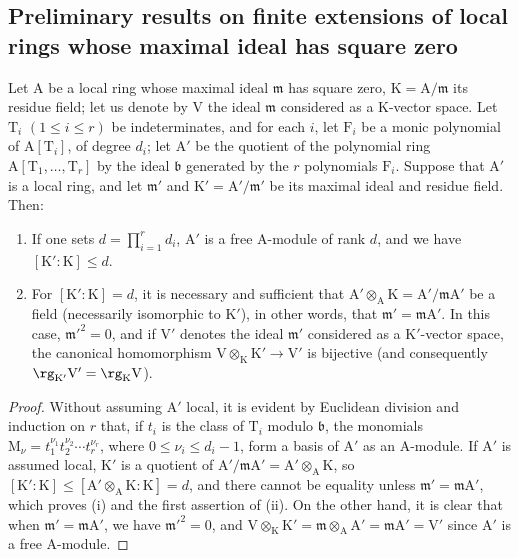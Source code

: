 \subsection{Preliminary results on finite extensions of local rings whose maximal ideal has square zero}
\label{subsection:0.22.4}
\label{0.22.4}

\begin{proposition}[22.4.1]
\label{0.22.4.1}
Let $\mathrm{A}$ be a local ring whose maximal ideal $\mathfrak{m}$ has square zero, $\mathrm{K}=\mathrm{A}/\mathfrak{m}$ its residue field; let us denote by $\mathrm{V}$ the ideal $\mathfrak{m}$ considered as a $\mathrm{K}$-vector space.
Let $\mathrm{T}_i$ $(1\leq i\leq r)$ be indeterminates, and for each $i$, let $\mathrm{F}_i$ be a monic polynomial of $\mathrm{A}[\mathrm{T}_i]$, of degree $d_i$; let $\mathrm{A}'$ be the quotient of the polynomial ring $\mathrm{A}[\mathrm{T}_1,\ldots,\mathrm{T}_r]$ by the ideal $\mathfrak{b}$ generated by the $r$ polynomials $\mathrm{F}_i$.
Suppose that $\mathrm{A}'$ is a local ring, and let $\mathfrak{m}'$ and $\mathrm{K}'=\mathrm{A}'/\mathfrak{m}'$ be its maximal ideal and residue field.
Then:
\begin{enumerate}
  \item[\rm{(i)}] If one sets $d=\prod_{i=1}^r d_i$, $\mathrm{A}'$ is a free $\mathrm{A}$-module of rank $d$, and we have $[\mathrm{K}':\mathrm{K}]\leq d$.
  \item[\rm{(ii)}] For $[\mathrm{K}':\mathrm{K}]=d$, it is necessary and sufficient that $\mathrm{A}'\otimes_\mathrm{A}\mathrm{K}=\mathrm{A}'/\mathfrak{m}\mathrm{A}'$ be a field (necessarily isomorphic to $\mathrm{K}'$), in other words, that $\mathfrak{m}'=\mathfrak{m}\mathrm{A}'$.
  In this case, $\mathfrak{m}'^2=0$, and if $\mathrm{V}'$ denotes the ideal $\mathfrak{m}'$ considered as a $\mathrm{K}'$-vector space, the canonical homomorphism $\mathrm{V}\otimes_\mathrm{K}\mathrm{K}'\to\mathrm{V}'$ is bijective (and consequently $\rg_{\mathrm{K}'}\mathrm{V}'=\rg_\mathrm{K}\mathrm{V}$).
\end{enumerate}
\end{proposition}

\begin{proof}
Without assuming $\mathrm{A}'$ local, it is evident by Euclidean division and induction on $r$ that, if $t_i$ is the class of $\mathrm{T}_i$ modulo $\mathfrak{b}$, the monomials $\mathrm{M}_\nu=t_1^{\nu_1}t_2^{\nu_2}\cdots t_r^{\nu_r}$, where $0\leq\nu_i\leq d_i-1$, form a basis of $\mathrm{A}'$ as an $\mathrm{A}$-module.
If $\mathrm{A}'$ is assumed local, $\mathrm{K}'$ is a quotient of $\mathrm{A}'/\mathfrak{m}\mathrm{A}'=\mathrm{A}'\otimes_\mathrm{A}\mathrm{K}$, so $[\mathrm{K}':\mathrm{K}]\leq[\mathrm{A}'\otimes_\mathrm{A}\mathrm{K}:\mathrm{K}]=d$, and there cannot be equality unless $\mathfrak{m}'=\mathfrak{m}\mathrm{A}'$, which proves (i) and the first assertion of (ii).
On the other hand, it is clear that when $\mathfrak{m}'=\mathfrak{m}\mathrm{A}'$, we have $\mathfrak{m}'^2=0$, and $\mathrm{V}\otimes_\mathrm{K}\mathrm{K}'=\mathfrak{m}\otimes_\mathrm{A}\mathrm{A}'=\mathfrak{m}\mathrm{A}'=\mathrm{V}'$ since $\mathrm{A}'$ is a free $\mathrm{A}$-module.
\end{proof}

